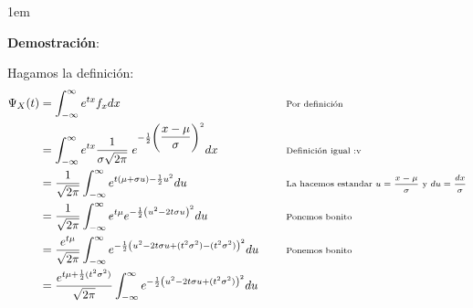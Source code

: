 \documentclass[12pt, fleqn]{report}                             %
\newenvironment{SmallIndentation}[1][0.75em]                    %
        {\begin{adjustwidth}{#1}{}\begin{footnotesize}}             %
        {\end{footnotesize}\end{adjustwidth}}                       %
\DeclareMathOperator \Space     {\quad}                         %
\newcommand \Remember[1]    {\Space\text{\scriptsize{#1}}}      %
\theoremstyle{break}                                            %
\newcommand{\Wrap}[1]           {\left( #1 \right)}             %
\newcommand{\pfrac}[2]      {\Wrap{\dfrac{#1}{#2}}}             %
\begin{document}
                \begin{SmallIndentation}[1em]
                    \textbf{Demostración}:
                    
                    Hagamos la definición:
                    \begin{align*}
                        \Psi_X(t) 
                            &= \int_{-\infty}^\infty e^{tx} f_x dx                                  
                                && \Remember{Por definición}                                        \\
                            &= \int_{-\infty}^\infty e^{tx} 
                                    \dfrac{1}{\sigma \sqrt{2\pi}} \; 
                                        e^{-\frac{1}{2}\pfrac{x - \mu}{\sigma}^2} dx               
                                && \Remember{Definición igual :v}                                   \\
                            &= \dfrac{1}{\sqrt{2\pi}}
                                    \int_{-\infty}^\infty 
                                        e^{t(\mu + \sigma u) - \frac{1}{2}u^2} du
                                && \Remember{La hacemos estandar 
                                    $u=\dfrac{x-\mu}{\sigma}$ y $du=\dfrac{dx}{\sigma}$}            \\
                            &= \dfrac{1}{\sqrt{2\pi}}
                                    \int_{-\infty}^\infty 
                                        e^{t\mu}
                                        e^{-\frac{1}{2} \Wrap{u^2 -2t\sigma u}^2} du
                                && \Remember{Ponemos bonito}                                        \\
                            &= \dfrac{e^{t\mu}}{\sqrt{2\pi}}
                                    \int_{-\infty}^\infty 
                                        e^{-\frac{1}{2} 
                                            \Wrap{u^2 -2t\sigma u + (t^2\sigma^2) - (t^2\sigma^2)}^2
                                        } du
                                && \Remember{Ponemos bonito}                                        \\
                            &= \dfrac{e^{t\mu + \frac{1}{2}(t^2\sigma^2)}}{\sqrt{2\pi}}
                                    \int_{-\infty}^\infty 
                                        e^{-\frac{1}{2} 
                                            \Wrap{u^2 -2t\sigma u + (t^2\sigma^2)}^2
                                        } du

\end{align*}
\end{SmallIndentation}
\end{document}
